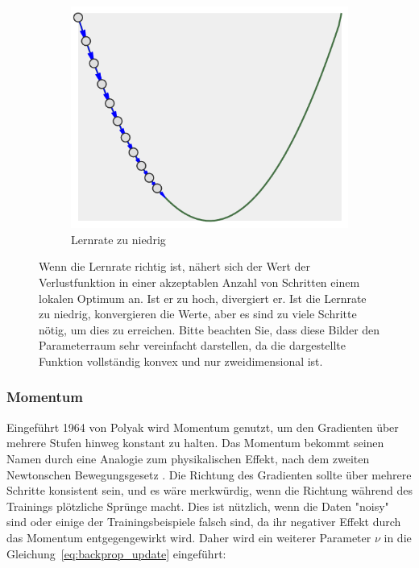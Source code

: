 \begin{figure}
\begin{subfigure}[b]{0.3\textwidth}
        \includegraphics[width=\textwidth]{images/lr_too_low.png}
        \caption{Lernrate zu niedrig}
        \label{fig:lr_too-low}
    \end{subfigure}
    \caption[Lernrate]{Wenn die Lernrate richtig ist, nähert sich der Wert der Verlustfunktion in einer akzeptablen Anzahl von Schritten einem lokalen Optimum an.
    Ist er zu hoch, divergiert er.
    Ist die Lernrate zu niedrig, konvergieren die Werte, aber es sind zu viele Schritte nötig, um dies zu erreichen.
    Bitte beachten Sie, dass diese Bilder den Parameterraum sehr vereinfacht darstellen, da die dargestellte Funktion vollständig konvex und nur zweidimensional ist.}
    \label{fig:learning_rate}
\end{figure}

\subsubsection{Momentum}

Eingeführt 1964 von Polyak \cite{Polyak1964} wird Momentum genutzt, um den Gradienten über mehrere Stufen hinweg konstant zu halten.
Das Momentum bekommt seinen Namen durch eine Analogie zum physikalischen Effekt, nach dem zweiten Newtonschen Bewegungsgesetz \cite[S.12]{Newton1687}.
Die Richtung des Gradienten sollte über mehrere Schritte konsistent sein, und es wäre merkwürdig, wenn die Richtung während des Trainings plötzliche Sprünge macht.
Dies ist nützlich, wenn die Daten "noisy" sind oder einige der Trainingsbeispiele falsch sind, da ihr negativer Effekt durch das Momentum entgegengewirkt wird.
Daher wird ein weiterer Parameter $\nu$ in die Gleichung~\eqref{eq:backprop_update} eingeführt:

